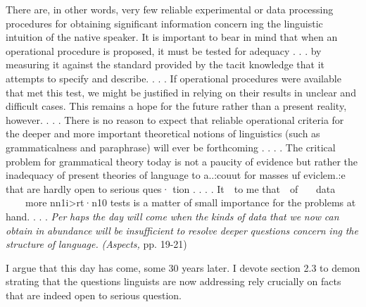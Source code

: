 \begin{styleStandard}
There are, in other words, very few reliable experimental or data\- processing procedures for obtaining significant information concern\- ing the linguistic intuition of the native speaker. It is important to bear in mind that when an operational procedure is proposed, it must be tested for adequacy . . . by measuring it against the standard provided by the tacit knowledge that it attempts to specify and describe. . . . If operational procedures were available that met this test, we might be justified in relying on their results in unclear and difficult cases. This remains a hope for the future rather than a present reality, however. . . . There is no reason to expect that reliable operational criteria for the deeper and more important theoretical notions of linguistics (such as {\textquotedbl}grammaticalness{\textquotedbl} and {\textquotedbl}paraphrase{\textquotedbl}) will ever be forthcoming . . . . The critical problem for grammatical theory today is not a paucity of evidence but rather the inadequacy of present theories of language to a..:couut for masses uf eviclem.:e that are hardly open to serious ques· tion . . . . It\ \ to me that\ \ of \ \ \ data \ \ \ \ more nn1i{\textgreater}rt·n10 tests is a matter of small importance for the problems at hand. . . . \textit{Per\-}\textit{ }\textit{haps}\textit{ }\textit{the}\textit{ }\textit{day}\textit{ }\textit{will}\textit{ }\textit{come}\textit{ }\textit{when}\textit{ }\textit{the}\textit{ }\textit{kinds}\textit{ }\textit{of}\textit{ }\textit{data}\textit{ }\textit{that}\textit{ }\textit{we}\textit{ }\textit{now}\textit{ }\textit{can}\textit{ }\textit{obtain}\textit{ }\textit{in}\textit{ }\textit{abundance}\textit{ }\textit{will}\textit{ }\textit{be}\textit{ }\textit{insufficient}\textit{ }\textit{to}\textit{ }\textit{resolve}\textit{ }\textit{deeper}\textit{ }\textit{questions}\textit{ }\textit{concern\-}\textit{ }\textit{ing}\textit{ }\textit{the}\textit{ }\textit{structure}\textit{ }\textit{of}\textit{ }\textit{language.}\textit{ }\textit{(}\textit{Aspects,}\textit{ }pp. 19-21)
\end{styleStandard}


\begin{styleStandard}
I argue that this day has come, some 30 years later. I devote section 2.3 to demon\- strating that the questions linguists are now addressing rely crucially on facts that are indeed {\textquotedbl}open to serious question.{\textquotedbl}
\end{styleStandard}


